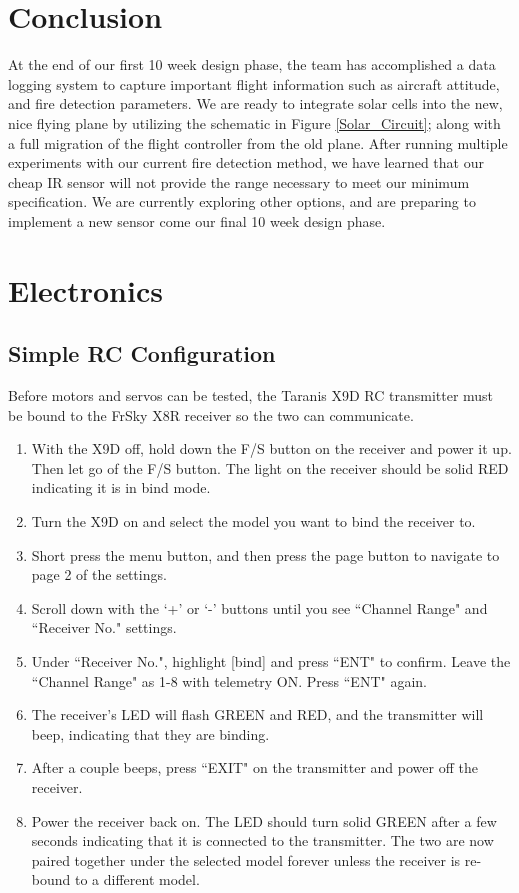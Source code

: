 \documentclass[12pt,journal,compsoc]{IEEEtran}
\begin{document}
\section{Conclusion}
At the end of our first 10 week design phase, the team has accomplished a data logging system to capture important flight information such as aircraft attitude, and fire detection parameters. We are ready to integrate solar cells into the new, nice flying plane by utilizing the schematic in Figure \ref{Solar_Circuit}; along with a full migration of the flight controller from the old plane. After running multiple experiments with our current fire detection method, we have learned that our cheap IR sensor will not provide the range necessary to meet our minimum specification. We are currently exploring other options, and are preparing to implement a new sensor come our final 10 week design phase.

\appendices
\section{Electronics}
\label{electronics}
\subsection{Simple RC Configuration}
Before motors and servos can be tested, the Taranis X9D RC transmitter must be bound to the FrSky X8R receiver so the two can communicate.
\begin{enumerate}
\item With the X9D off, hold down the F/S button on the receiver and power it up. Then let go of the F/S button. The light on the receiver should be solid RED indicating it is in bind mode.
\item Turn the X9D on and select the model you want to bind the receiver to.
\item Short press the menu button, and then press the page button to navigate to page 2 of the settings.
\item Scroll down with the `+' or `-' buttons until you see ``Channel Range" and ``Receiver No." settings.
\item Under ``Receiver No.", highlight [bind] and press ``ENT" to confirm. Leave the ``Channel Range" as 1-8 with telemetry ON. Press ``ENT" again.
\item The receiver's LED will flash GREEN and RED, and the transmitter will beep, indicating that they are binding.
\item After a couple beeps, press ``EXIT" on the transmitter and power off the receiver.
\item Power the receiver back on. The LED should turn solid GREEN after a few seconds indicating that it is connected to the transmitter. The two are now paired together under the selected model forever unless the receiver is re-bound to a different model.
\end{enumerate}
\end{document}
